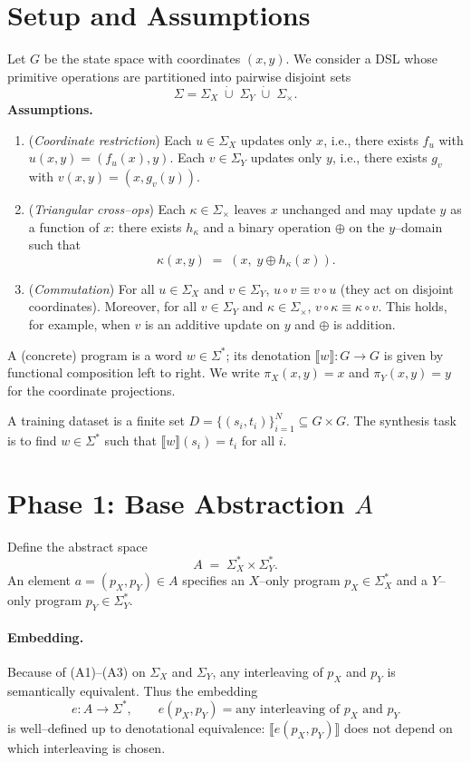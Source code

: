 \documentclass[11pt]{article}
\newcommand{\sem}[1]{\llbracket #1 \rrbracket}
\begin{document}
\section{Setup and Assumptions}\label{sec:setup}
Let $G$ be the state space with coordinates $(x,y)$. We consider a DSL whose primitive operations are partitioned into pairwise disjoint sets
\[
\Sigma = \Sigma_X \;\dot\cup\; \Sigma_Y \;\dot\cup\; \Sigma_\times.
\]
\textbf{Assumptions.}
\begin{enumerate}[label=(A\arabic*),leftmargin=2.0em]
    \item (\emph{Coordinate restriction}) Each $u\in\Sigma_X$ updates only $x$, i.e., there exists $f_u$ with $u(x,y)=(f_u(x),y)$. Each $v\in\Sigma_Y$ updates only $y$, i.e., there exists $g_v$ with $v(x,y)=(x,g_v(y))$.
    \item (\emph{Triangular cross--ops}) Each $\kappa\in\Sigma_\times$ leaves $x$ unchanged and may update $y$ as a function of $x$: there exists $h_\kappa$ and a binary operation $\oplus$ on the $y$--domain such that
    \[
    \kappa(x,y) \;=\; (x,\; y \oplus h_\kappa(x)).
    \]
    \item (\emph{Commutation}) For all $u\in\Sigma_X$ and $v\in\Sigma_Y$, $u\circ v \equiv v\circ u$ (they act on disjoint coordinates). Moreover, for all $v\in\Sigma_Y$ and $\kappa\in\Sigma_\times$, $v\circ \kappa \equiv \kappa\circ v$. This holds, for example, when $v$ is an additive update on $y$ and $\oplus$ is addition.
\end{enumerate}
A (concrete) program is a word $w\in\Sigma^*$; its denotation $\sem{w}:G\to G$ is given by functional composition left to right. We write $\pi_X(x,y)=x$ and $\pi_Y(x,y)=y$ for the coordinate projections.

A training dataset is a finite set $D=\{(s_i,t_i)\}_{i=1}^N\subseteq G\times G$. The synthesis task is to find $w\in\Sigma^*$ such that $\sem{w}(s_i)=t_i$ for all $i$.

\section{Phase 1: Base Abstraction \texorpdfstring{$A$}{A}}\label{sec:baseA}
Define the abstract space
\[
A \;=\; \Sigma_X^{*}\times \Sigma_Y^{*}.
\]
An element $a=(p_X,p_Y)\in A$ specifies an $X$--only program $p_X\in\Sigma_X^*$ and a $Y$--only program $p_Y\in\Sigma_Y^*$.

\paragraph{Embedding.} Because of (A1)--(A3) on $\Sigma_X$ and $\Sigma_Y$, any interleaving of $p_X$ and $p_Y$ is semantically equivalent. Thus the embedding
\[
e: A\to \Sigma^*,\qquad e(p_X,p_Y)=\text{any interleaving of $p_X$ and $p_Y$}
\]
is well--defined up to denotational equivalence: $\sem{e(p_X,p_Y)}$ does not depend on which interleaving is chosen.
\end{document}
